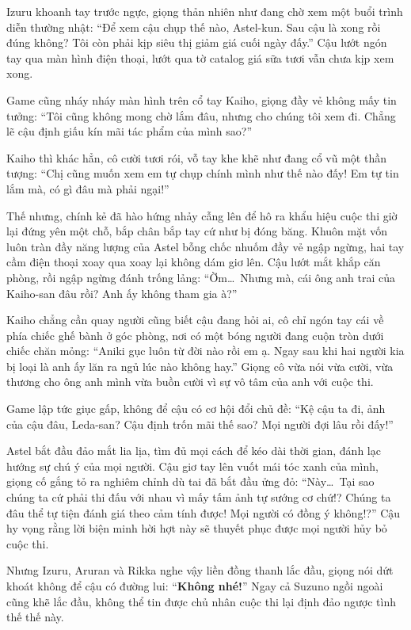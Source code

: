 \documentclass[../main.tex]{subfiles}
\begin{document}
Izuru khoanh tay trước ngực, giọng thản nhiên như đang chờ xem một buổi trình diễn thường nhật: ``Để xem cậu chụp thế nào, Astel-kun. Sau cậu là xong rồi đúng không? Tôi còn phải kịp siêu thị giảm giá cuối ngày đấy.'' Cậu lướt ngón tay qua màn hình điện thoại, lướt qua tờ catalog giá sữa tươi vẫn chưa kịp xem xong.

Game cũng nháy nháy màn hình trên cổ tay Kaiho, giọng đầy vẻ không mấy tin tưởng: ``Tôi cũng không mong chờ lắm đâu, nhưng cho chúng tôi xem đi. Chẳng lẽ cậu định giấu kín mãi tác phẩm của mình sao?''

Kaiho thì khác hẳn, cô cười tươi rói, vỗ tay khe khẽ như đang cổ vũ một thần tượng: ``Chị cũng muốn xem em tự chụp chính mình như thế nào đấy! Em tự tin lắm mà, có gì đâu mà phải ngại!''

Thế nhưng, chính kẻ đã hào hứng nhảy cẫng lên để hô ra khẩu hiệu cuộc thi giờ lại đứng yên một chỗ, bắp chân bắp tay cứ như bị đóng băng. Khuôn mặt vốn luôn tràn đầy năng lượng của Astel bỗng chốc nhuốm đầy vẻ ngập ngừng, hai tay cầm điện thoại xoay qua xoay lại không dám giơ lên. Cậu lướt mắt khắp căn phòng, rồi ngập ngừng đánh trống lảng: ``Ờm\dots\ Nhưng mà, cái ông anh trai của Kaiho-san đâu rồi? Anh ấy không tham gia à?''

Kaiho chẳng cần quay người cũng biết cậu đang hỏi ai, cô chỉ ngón tay cái về phía chiếc ghế bành ở góc phòng, nơi có một bóng người đang cuộn tròn dưới chiếc chăn mỏng: ``Aniki gục luôn từ đời nào rồi em ạ. Ngay sau khi hai người kia bị loại là anh ấy lăn ra ngủ lúc nào không hay.'' Giọng cô vừa nói vừa cười, vừa thương cho ông anh mình vừa buồn cười vì sự vô tâm của anh với cuộc thi.

Game lập tức giục gấp, không để cậu có cơ hội đổi chủ đề: ``Kệ cậu ta đi, ảnh của cậu đâu, Leda-san? Cậu định trốn mãi thế sao? Mọi người đợi lâu rồi đấy!''

Astel bắt đầu đảo mắt lia lịa, tìm đủ mọi cách để kéo dài thời gian, đánh lạc hướng sự chú ý của mọi người. Cậu giơ tay lên vuốt mái tóc xanh của mình, giọng cố gắng tỏ ra nghiêm chỉnh dù tai đã bắt đầu ửng đỏ: ``Này\dots\ Tại sao chúng ta cứ phải thi đấu với nhau vì mấy tấm ảnh tự sướng cơ chứ!? Chúng ta đâu thể tự tiện đánh giá theo cảm tính được! Mọi người có đồng ý không!?'' Cậu hy vọng rằng lời biện minh hời hợt này sẽ thuyết phục được mọi người hủy bỏ cuộc thi.

Nhưng Izuru, Aruran và Rikka nghe vậy liền đồng thanh lắc đầu, giọng nói dứt khoát không để cậu có đường lui: ``\textbf{Không nhé!}'' Ngay cả Suzuno ngồi ngoài cũng khẽ lắc đầu, không thể tin được chủ nhân cuộc thi lại định đảo ngược tình thế thế này.
\end{document}
